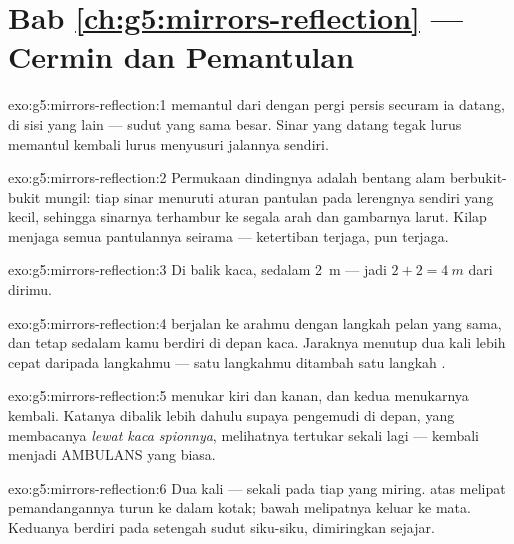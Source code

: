 \section*{Bab \ref{ch:g5:mirrors-reflection} --- Cermin dan Pemantulan}

\begin{solution}{exo:g5:mirrors-reflection:1}
 memantul dari  dengan pergi persis securam ia datang, di
sisi yang lain --- sudut yang sama besar. Sinar yang datang tegak
lurus memantul kembali lurus menyusuri jalannya sendiri.
\end{solution}

\begin{solution}{exo:g5:mirrors-reflection:2}
Permukaan dindingnya adalah bentang alam berbukit-bukit mungil: tiap
sinar menuruti aturan pantulan pada lerengnya sendiri yang kecil,
sehingga sinarnya terhambur ke segala arah dan gambarnya larut. Kilap
 menjaga semua pantulannya seirama --- ketertiban terjaga,
 pun terjaga.
\end{solution}

\begin{solution}{exo:g5:mirrors-reflection:3}
Di balik kaca, sedalam \qty{2}{m} --- jadi $2 + 2 = \qty{4}{m}$ dari
dirimu.
\end{solution}

\begin{solution}{exo:g5:mirrors-reflection:4}
 berjalan ke arahmu dengan langkah pelan yang sama, dan
tetap sedalam kamu berdiri di depan kaca. Jaraknya menutup dua kali
lebih cepat daripada langkahmu --- satu langkahmu ditambah satu
langkah .
\end{solution}

\begin{solution}{exo:g5:mirrors-reflection:5}
 menukar kiri dan kanan, dan  kedua menukarnya kembali.
Katanya dibalik lebih dahulu supaya pengemudi di depan, yang membacanya
\emph{lewat kaca spionnya}, melihatnya tertukar sekali lagi ---
kembali menjadi AMBULANS yang biasa.
\end{solution}

\begin{solution}{exo:g5:mirrors-reflection:6}
Dua kali --- sekali pada tiap  yang miring.  atas melipat
 pemandangannya turun ke dalam kotak;  bawah melipatnya
keluar ke mata. Keduanya berdiri pada setengah sudut siku-siku,
dimiringkan sejajar.
\end{solution}


